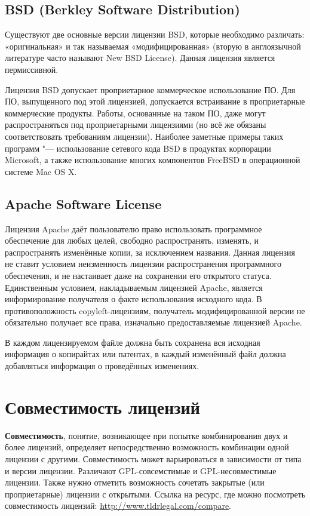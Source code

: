 \documentclass[10pt, a5paper]{article}
\begin{document}
\subsection*{BSD (Berkley Software Distribution)}

Существуют две основные версии лицензии BSD, которые необходимо различать: «оригинальная» и так называемая «модифицированная» (вторую в англоязычной литературе часто называют New BSD License). Данная лицензия является пермиссивной.

Лицензия BSD допускает проприетарное коммерческое использование ПО. Для ПО, выпущенного под этой лицензией, допускается встраивание в проприетарные коммерческие продукты. Работы, основанные на таком ПО, даже могут распространяться под проприетарными лицензиями (но всё же обязаны соответствовать требованиям лицензии). Наиболее заметные примеры таких программ "--- использование сетевого кода BSD в продуктах корпорации Microsoft, а также использование многих компонентов FreeBSD в операционной системе Mac OS X.

\subsection*{Apache Software License}

Лицензия Apache даёт пользователю право использовать программное обеспечение для любых целей, свободно распространять, изменять, и распространять изменённые копии, за исключением названия. 
Данная лицензия не ставит условием неизменность лицензии распространения программного обеспечения, и не настаивает даже на сохранении его открытого статуса. Единственным условием, накладываемым лицензией Apache, является информирование получателя о факте использования исходного кода. В противоположность copyleft-лицензиям, получатель модифицированной версии не обязательно получает все права, изначально предоставляемые лицензией Apache.

В каждом лицензируемом файле должна быть сохранена вся исходная информация о копирайтах или патентах, в каждый изменённый файл должна добавляться информация о проведённых изменениях.

\section*{Совместимость лицензий}

\textbf{Совместимость}, понятие, возникающее при попытке комбинирования двух и более лицензий, определяет непосредственно возможность комбинации одной лицензии с другими. Совместимость может варьироваться в зависимости от типа и версии лицензии. Различают GPL-совсемстимые и GPL-несовместимые лицензии. \linebreak Также нужно отметить возможность сочетать закрытые (или проприетарные) лицензии с открытыми. Ссылка на ресурс, где можно посмотреть совместимость лицензий: \url{http://www.tldrlegal.com/compare}.
\end{document}

